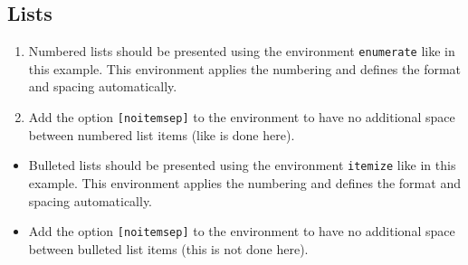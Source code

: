     
    
    
    
    


\subsection{Lists}
\label{subsec:lists}

\begin{enumerate}
  \item Numbered lists should be presented using the environment \verb|enumerate| like in this example. 
  This environment applies the numbering and defines the format and spacing automatically. 
  \item Add the option \verb|[noitemsep]| to the environment to have no additional space between numbered list items (like is done here).
\end{enumerate}

\begin{itemize}
  \item Bulleted lists should be presented using the environment \verb|itemize| like in this example. 
  This environment applies the numbering and defines the format and spacing automatically. 
  \item Add the option \verb|[noitemsep]| to the environment to have no additional space between bulleted list items  (this is not done here).
\end{itemize}

